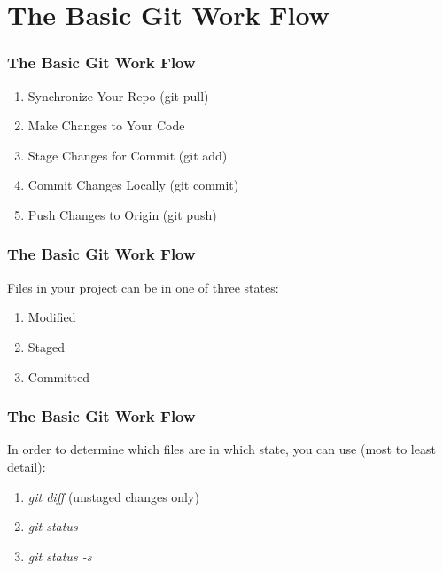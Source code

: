 
\section[Basic Git]{The Basic Git Work Flow}

\begin{frame}
\frametitle{\large The Basic Git Work Flow}
\begin{enumerate}
\item Synchronize Your Repo (git pull)
\item Make Changes to Your Code
\item Stage Changes for Commit (git add)
\item Commit Changes Locally (git commit)
\item Push Changes to Origin (git push)
\end{enumerate}
\end{frame}

\note{}

\begin{frame}
\frametitle{\large The Basic Git Work Flow}
Files in your project can be in one of three states:
\begin{enumerate}
\item Modified
\item Staged
\item Committed
\end{enumerate}
\end{frame}

\begin{frame}
\frametitle{\large The Basic Git Work Flow}
In order to determine which files are in which state, you can use (most to least detail):
\begin{enumerate}
\item \emph{git diff} (unstaged changes only)
\item \emph{git status}
\item \emph{git status -s}
\end{enumerate}
\end{frame}
\note{}


